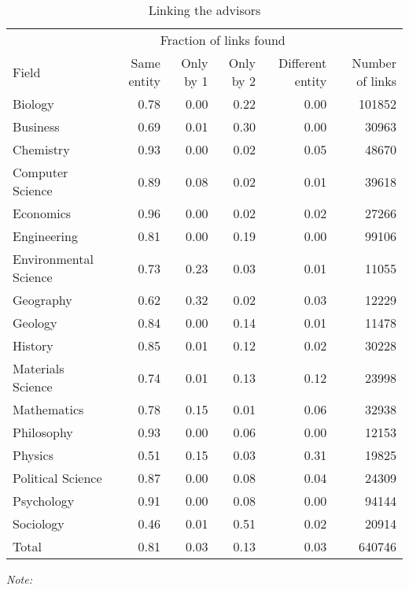 \begin{table}

\caption{\label{tab:compare_linking_advisors}Linking the advisors}
\centering
\fontsize{9}{11}\selectfont
\begin{threeparttable}
\begin{tabular}[t]{lrrrrr}
\toprule
\multicolumn{1}{c}{ } & \multicolumn{4}{c}{Fraction of links found} & \multicolumn{1}{c}{ } \\
Field & Same entity & Only by 1 & Only by 2 & Different entity & Number of links\\
\midrule
Biology & 0.78 & 0.00 & 0.22 & 0.00 & 101852\\
Business & 0.69 & 0.01 & 0.30 & 0.00 & 30963\\
Chemistry & 0.93 & 0.00 & 0.02 & 0.05 & 48670\\
Computer Science & 0.89 & 0.08 & 0.02 & 0.01 & 39618\\
Economics & 0.96 & 0.00 & 0.02 & 0.02 & 27266\\
\addlinespace
Engineering & 0.81 & 0.00 & 0.19 & 0.00 & 99106\\
Environmental Science & 0.73 & 0.23 & 0.03 & 0.01 & 11055\\
Geography & 0.62 & 0.32 & 0.02 & 0.03 & 12229\\
Geology & 0.84 & 0.00 & 0.14 & 0.01 & 11478\\
History & 0.85 & 0.01 & 0.12 & 0.02 & 30228\\
\addlinespace
Materials Science & 0.74 & 0.01 & 0.13 & 0.12 & 23998\\
Mathematics & 0.78 & 0.15 & 0.01 & 0.06 & 32938\\
Philosophy & 0.93 & 0.00 & 0.06 & 0.00 & 12153\\
Physics & 0.51 & 0.15 & 0.03 & 0.31 & 19825\\
Political Science & 0.87 & 0.00 & 0.08 & 0.04 & 24309\\
\addlinespace
Psychology & 0.91 & 0.00 & 0.08 & 0.00 & 94144\\
Sociology & 0.46 & 0.01 & 0.51 & 0.02 & 20914\\
\midrule
Total & 0.81 & 0.03 & 0.13 & 0.03 & 640746\\
\bottomrule
\end{tabular}
\begin{tablenotes}[para]
\small
\item \textit{Note: } 

\end{tablenotes}
\end{threeparttable}
\end{table}
